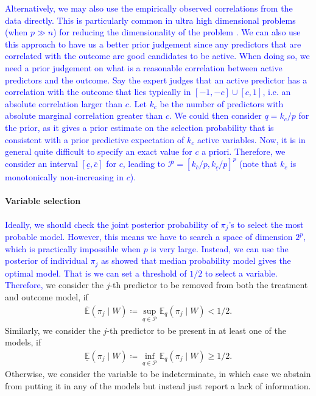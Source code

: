 \documentclass[preprint,12pt]{elsarticle}
\newcommand{\lexp}{\underline{\mathbb{E}}}
\newcommand{\uexp}{\overline{\mathbb{E}}}
\newcommand{\added}[1]{\textcolor{blue}{#1}}
\begin{document}
\added{%
Alternatively, we may also use the empirically observed correlations from the data directly. This is particularly common in ultra high
dimensional problems (when $p\gg n$) for reducing the dimensionality
of the problem \citep{fan2008}. We can also use this approach
to have us a better prior judgement since any predictors that are correlated with the outcome are good candidates to be active.
When doing so, we need
a prior judgement on what is a reasonable
correlation between active predictors and the outcome.
Say the expert judges that
an active predictor has a correlation with the outcome
that lies typically in $[-1,-c]\cup[c,1]$, i.e.
an absolute correlation larger than $c$.
Let $k_c$ be the number of predictors with absolute marginal correlation greater than $c$.
We could then consider $q=k_c/p$ for the prior, as it gives a prior estimate on the selection probability that is consistent with a prior predictive expectation of $k_c$ active variables.
Now, it is in general quite difficult to specify an exact value for $c$ a priori.
Therefore, we consider an interval $[\underline{c},\overline{c}]$ for $c$, leading to
$\mathcal{P}=\left[k_{\overline{c}}/p, k_{\underline{c}}/p\right]^p$
(note that $k_c$ is monotonically non-increasing in $c$).
}

\paragraph{Variable selection}
\added{Ideally, we should check the joint posterior probability of $\pi_j$'s to select the most probable model. However, this means we have to search a space of dimension $2^p$, which is practically impossible when $p$ is very large. Instead, we can use the posterior of individual $\pi_j$ as \citet{barbieri2004} showed that median probability model gives the optimal model. That is we can set a threshold of $1/2$ to select a variable. Therefore,}
we consider the $j$-th predictor to be removed from both the
treatment and outcome model, if
\begin{align}\label{eq:vs:remove}
	\uexp (\pi_j\mid W)\coloneqq \sup_{q\in \mathcal{P}} \mathbb{E}_q(\pi_j\mid W) < 1/2.
\end{align}
Similarly, we consider the $j$-th predictor to be present in at least one of the models, if
\begin{align}\label{eq:vs:sel}
	\lexp (\pi_j\mid W)\coloneqq \inf_{q\in \mathcal{P}} \mathbb{E}_q(\pi_j\mid W) \ge 1/2.
\end{align}
Otherwise, we consider the variable to be indeterminate,  in which case we abstain from putting
it in any of the models but instead just report a lack of information.
\end{document}
